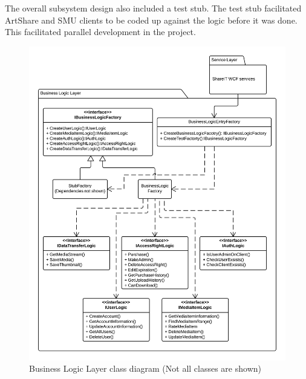 \documentclass[../report.tex]{subfiles}
\begin{document}
The overall subsystem design also included a test stub. The test stub facilitated ArtShare and SMU clients to be coded up against the logic before it was done. This facilitated parallel development in the project.








\begin{figure}
\centering
\includegraphics[width=\linewidth]{BLLclassdiagram.png}
\caption{Business Logic Layer class diagram (Not all classes are shown)}
\label{fig:BLLclassdiagram}
\end{figure}
\end{document}
